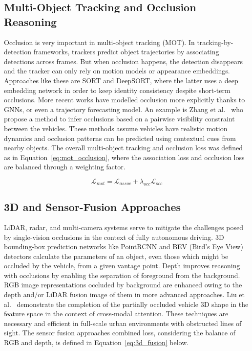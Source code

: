 \documentclass[12pt,a4paper]{report}
\theoremstyle{definition}
\theoremstyle{remark}
\begin{document}
\subsection{Multi-Object Tracking and Occlusion Reasoning}
Occlusion is very important in multi-object tracking (MOT). In tracking-by-detection frameworks, trackers predict object trajectories by associating detections across frames. But when occlusion happens, the detection disappears and the tracker can only rely on motion models or appearance embeddings. Approaches like these are SORT and DeepSORT, where the latter uses a deep embedding network in order to keep identity consistency despite short-term occlusions. More recent works have modelled occlusion more explicitly thanks to GNNs, or even a trajectory forecasting model. An example is Zhang et al.~\cite{paper22} who propose a method to infer occlusions based on a pairwise visibility constraint between the vehicles. These methods assume vehicles have realistic motion dynamics and occlusion patterns can be predicted using contextual cues from nearby objects. The overall multi-object tracking and occlusion loss was defined as in Equation~\ref{eq:mot_occlusion}, where the association loss and occlusion loss are balanced through a weighting factor.

\begin{equation}
\label{eq:mot_occlusion}
    \mathcal{L}_{mot} = \mathcal{L}_{assoc} + \lambda_{occ} \mathcal{L}_{occ}
\end{equation}

\subsection{3D and Sensor-Fusion Approaches}
LiDAR, radar, and multi-camera systems serve to mitigate the challenges posed by single-vision occlusions in the context of fully autonomous driving. 3D bounding-box prediction networks like PointRCNN and BEV (Bird’s Eye View) detectors calculate the parameters of an object, even those which might be occluded by the vehicle, from a given vantage point. Depth improves reasoning with occlusions by enabling the separation of foreground from the background. RGB image representations occluded by background are enhanced owing to the depth and/or LiDAR fusion image of them in more advanced approaches. Liu et al.~\cite{paper31} demonstrate the completion of the partially occluded vehicle 3D shape in the feature space in the context of cross-modal attention. These techniques are necessary and efficient in full-scale urban environments with obstructed lines of sight. The sensor fusion approaches combined loss, considering the balance of RGB and depth, is defined in Equation~\ref{eq:3d_fusion} below.
\end{document}
